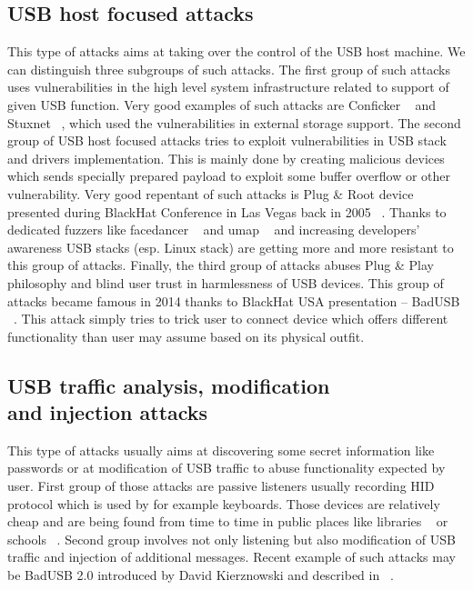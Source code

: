 \documentclass[10pt, a5paper]{article}
\begin{document}
\subsection*{USB host focused attacks}
This type of attacks aims at taking over the control of the USB host machine.
We can distinguish three subgroups of such attacks.
The first group of such attacks uses vulnerabilities in the high level system infrastructure related to support of given USB function. Very good examples of such attacks are Conficker  ~\cite{Opasiak-1} and Stuxnet ~\cite{Opasiak-2}, which used the vulnerabilities in external storage support.
The second group of USB host focused attacks tries to exploit vulnerabilities in USB stack and drivers implementation. This is mainly done by creating malicious devices which sends specially prepared payload to exploit some buffer overflow or other vulnerability. Very good repentant of such attacks is Plug \& Root device presented during BlackHat Conference in Las Vegas back in 2005  ~\cite{Opasiak-3}.
Thanks to dedicated fuzzers like facedancer  ~\cite{Opasiak-4} and umap  ~\cite{Opasiak-5} and increasing developers’ awareness USB stacks (esp. Linux stack) are getting more and more resistant to this group of attacks.
Finally, the third group of attacks abuses Plug \& Play philosophy and blind user trust in harmlessness of USB devices. This group of attacks became famous in 2014 thanks to BlackHat USA presentation – BadUSB  ~\cite{Opasiak-6}. This attack simply tries to trick user to connect device which offers different functionality than user may assume based on its physical outfit.

\subsection*{USB traffic analysis, modification \\ and injection attacks}
This type of attacks usually aims at discovering some secret \linebreak information like passwords or at modification of USB traffic to abuse functionality expected by user.
First group of those attacks are passive listeners usually recording HID protocol which is used by for example keyboards. Those devices are relatively cheap and are being found from time to time in public places like libraries  ~\cite{Opasiak-7} or schools  ~\cite{Opasiak-8}.
Second group involves not only listening but also modification of USB traffic and injection of additional messages. Recent example of such attacks may be BadUSB 2.0 introduced by David Kierznowski and described in  ~\cite{Opasiak-9}.
\end{document}
